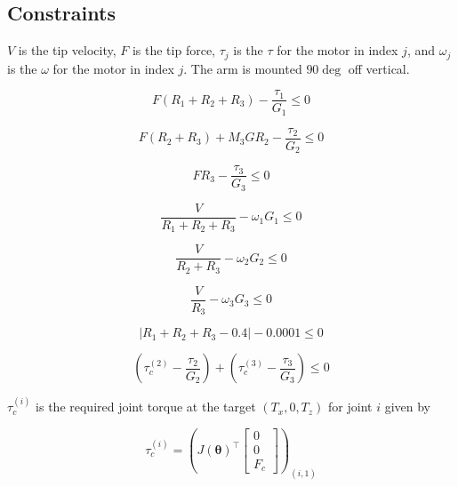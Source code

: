 \documentclass{article}
\begin{document}
\FloatBarrier{}
\subsection{Constraints}

$V$ is the tip velocity, $F$ is the tip force, $\tau_j$ is the $\tau$ for the
motor in index $j$, and $\omega_j$ is the $\omega$ for the motor in index $j$.
The arm is mounted $90 \deg$ off vertical.

\begin{equation}
    F \left( R_1 + R_2 + R_3 \right) - \frac{\tau_1}{G_1} \leq 0
\end{equation}

\begin{equation}
    F \left( R_2 + R_3 \right) + M_3 G R_2 - \frac{\tau_2}{G_2} \leq 0
\end{equation}

\begin{equation}
    F R_3 - \frac{\tau_3}{G_3} \leq 0
\end{equation}

\begin{equation}
    \frac{V}{R_1 + R_2 + R_3} - \omega_1 G_1 \leq 0
\end{equation}

\begin{equation}
    \frac{V}{R_2 + R_3} - \omega_2 G_2 \leq 0
\end{equation}

\begin{equation}
    \frac{V}{R_3} - \omega_3 G_3 \leq 0
\end{equation}

\begin{equation}
    |R_1 + R_2 + R_3 - 0.4| - 0.0001 \leq 0
\end{equation}

\begin{equation}
    \left( \tau_c^{(2)} - \frac{\tau_2}{G_2} \right) + \left( \tau_c^{(3)} - \frac{\tau_3}{G_3} \right) \leq 0
\end{equation}

$\tau_c^{(i)}$ is the required joint torque at the target $(T_x, 0,
T_z)$ for joint $i$ given by

\begin{equation}
    \tau_c^{(i)} = \left(
        J(\bm{\theta})^\top \begin{bmatrix}
            0 \\
            0 \\
            F_c
        \end{bmatrix}
        \right)_{(i,1)}
\end{equation}
\end{document}
